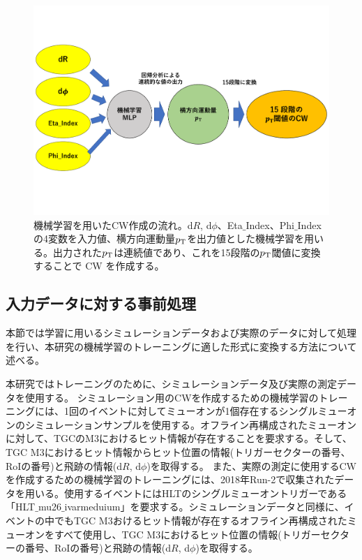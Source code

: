 \begin{figure}[tb]
  \centering
  \vspace{-3cm}
  \includegraphics[clip, width=15cm]{fig/4/MLPoverview2.pdf}
  \vspace{-2cm}
  \caption{機械学習を用いたCW作成の流れ。d$R$, d$\phi$、Eta$\_$Index、Phi$\_$Indexの4変数を入力値、横方向運動量$p_{\rm{T}}$を出力値とした機械学習を用いる。出力された$p_{\rm{T}}$は連続値であり、これを15段階の$p_{\rm{T}}$閾値に変換することで CW を作成する。}
  \label{fig:MLP_over}
\end{figure}

\subsection{入力データに対する事前処理}\label{事前処理}
本節では学習に用いるシミュレーションデータおよび実際のデータに対して処理を行い、本研究の機械学習のトレーニングに適した形式に変換する方法について述べる。

本研究ではトレーニングのために、シミュレーションデータ及び実際の測定データを使用する。
シミュレーション用のCWを作成するための機械学習のトレーニングには、1回のイベントに対してミューオンが1個存在するシングルミューオンのシミュレーションサンプルを使用する。オフライン再構成されたミューオンに対して、TGCのM3におけるヒット情報が存在することを要求する。そして、TGC M3におけるヒット情報からヒット位置の情報(トリガーセクターの番号、RoIの番号)と飛跡の情報(d$R$, d$\phi$)を取得する。
また、実際の測定に使用するCWを作成するための機械学習のトレーニングには、2018年Run-2で収集されたデータを用いる。使用するイベントにはHLTのシングルミューオントリガーである「HLT$\_$mu26$\_$ivarmeduium」を要求する。シミュレーションデータと同様に、イベントの中でもTGC M3おけるヒット情報が存在するオフライン再構成されたミューオンをすべて使用し、TGC M3におけるヒット位置の情報(トリガーセクターの番号、RoIの番号)と飛跡の情報(d$R$, d$\phi$)を取得する。

